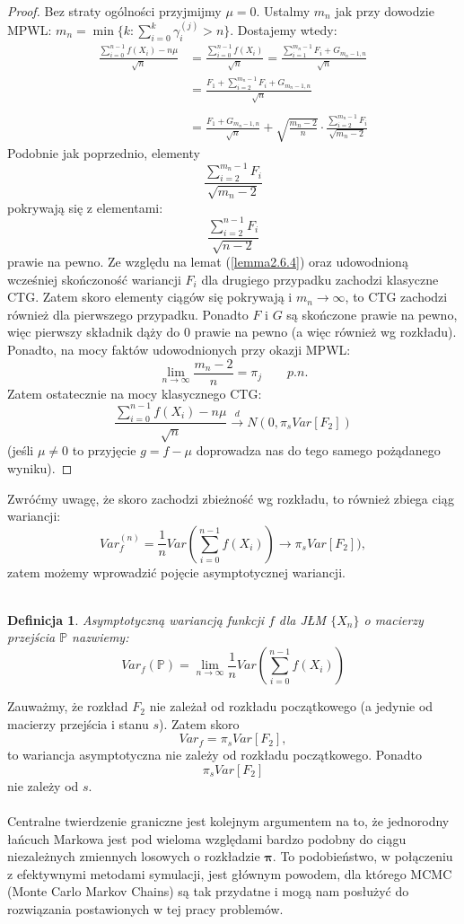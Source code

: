\documentclass[a4paper]{article}
\theoremstyle{defn}
\newtheorem{defn}{Definicja}[subsection]
\theoremstyle{theorem}
\theoremstyle{lemma}
\theoremstyle{cor}
\theoremstyle{fact}
\begin{document}
\begin{proof}
Bez straty ogólności przyjmijmy $\mu = 0$. Ustalmy $m_n$ jak przy dowodzie MPWL:
$m_n = \min \{k: \sum\limits_{i=0}^k \gamma_i^{(j)} > n\}$. Dostajemy wtedy:
\begin{align*}
    \frac{\sum\limits_{i=0}^{n-1} f(X_i) - n\mu}{\sqrt{n}} &= \frac{\sum\limits_{i=0}^{n-1} f(X_i)}{\sqrt{n}} = \frac{\sum\limits_{i=1}^{m_n-1} F_i + G_{m_n-1, n}}{\sqrt{n}}\\
    &= \frac{F_1 + \sum\limits_{i=2}^{m_n-1} F_i + G_{m_n-1, n}}{\sqrt{n}}\\\\
    &= \frac{F_1 + G_{m_n-1, n}}{\sqrt{n}} + \sqrt{\frac{m_n -2}{n}} \cdot \frac{\sum\limits_{i=2}^{m_n-1} F_i }{\sqrt{m_n-2}}
\end{align*}
Podobnie jak poprzednio, elementy $$\frac{\sum\limits_{i=2}^{m_n-1} F_i }{\sqrt{m_n-2}}$$
pokrywają się z elementami:
$$\frac{\sum\limits_{i=2}^{n-1} F_i }{\sqrt{n-2}}$$
prawie na pewno. Ze względu na lemat (\ref{lemma2.6.4}) oraz udowodnioną wcześniej skończoność wariancji $F_i$ dla drugiego przypadku zachodzi klasyczne CTG. Zatem skoro elementy ciągów się pokrywają i $m_n \to \infty$, to CTG zachodzi również dla pierwszego przypadku. Ponadto $F$ i $G$ są skończone prawie na pewno, więc pierwszy składnik dąży do 0 prawie na pewno (a więc również wg rozkładu). Ponadto, na mocy faktów udowodnionych przy okazji MPWL:
$$ \lim\limits_{n \to \infty} \frac{m_n -2}{n} = \pi_j \quad\quad p.n.$$
Zatem ostatecznie na mocy klasycznego CTG:
$$\frac{\sum\limits_{i=0}^{n-1} f(X_i) - n\mu}{\sqrt{n}} \overset{d}{\to} N(0, \pi_s Var[F_2])$$
(jeśli $\mu \neq 0$ to przyjęcie $g = f - \mu$ doprowadza nas do tego samego pożądanego wyniku).
\end{proof}
Zwróćmy uwagę, że skoro zachodzi zbieżność wg rozkładu, to również zbiega ciąg wariancji:
$$Var_f^{(n)} = \frac{1}{n} Var\left(\sum\limits_{i=0}^{n-1} f(X_i)\right) \to \pi_s Var[F_2]),$$
zatem możemy wprowadzić pojęcie asymptotycznej wariancji.\\\\
\begin{defn}\label{defn2.6.6}
Asymptotyczną wariancją funkcji $f$ dla JŁM $\{X_n\}$ o macierzy przejścia $\mathbb{P}$ nazwiemy:
$$Var_{f}(\mathbb{P}) = \lim\limits_{n \to \infty} \frac{1}{n} Var\left(\sum\limits_{i=0}^{n-1} f(X_i)\right)$$
\end{defn}
Zauważmy, że rozkład $F_2$ nie zależał od rozkładu początkowego (a jedynie od macierzy przejścia i stanu $s$). Zatem skoro $$Var_f = \pi_s Var[F_2],$$
to wariancja asymptotyczna nie zależy od rozkładu początkowego. Ponadto
$$\pi_s Var[F_2]$$
nie zależy od $s$.\\\\
Centralne twierdzenie graniczne jest kolejnym argumentem na to, że jednorodny łańcuch Markowa jest pod wieloma względami bardzo podobny do ciągu niezależnych zmiennych losowych o rozkładzie $\boldsymbol{\pi}$. To podobieństwo, w połączeniu z efektywnymi metodami symulacji, jest głównym powodem, dla którego MCMC (Monte Carlo Markov Chains) są tak przydatne i mogą nam posłużyć do rozwiązania postawionych w tej pracy problemów.\\
\end{document}
